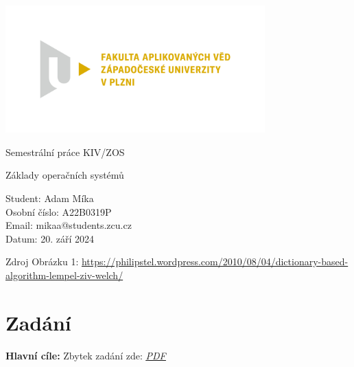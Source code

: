 \documentclass[12pt, a4paper]{article}
\begin{document}
\begin{titlepage}
    \includegraphics[width=0.75\textwidth]{img/fav.png}
    \begin{center}
        
        
        \vspace{2cm}
        
        \Huge
        Semestrální práce KIV/ZOS
        
        \vspace{1cm}
        
        \LARGE
        Základy operačních systémů
        
        \vfill
        
        \vspace{0.5cm}
        
        \normalsize
        \raggedright
        Student:        Adam Míka \\
        Osobní číslo:   A22B0319P \\
        Email:          mikaa@students.zcu.cz \\
        Datum:          20. září 2024
        \vspace{0.2cm}
        
    \end{center}
\end{titlepage}

\renewcommand{\cftsecleader}{\cftdotfill{\cftdotsep}}
\renewcommand{\cftsubsecleader}{\cftdotfill{\cftdotsep}}
\renewcommand{\cftsubsubsecleader}{\cftdotfill{\cftdotsep}}

\setcounter{page}{2}
\tableofcontents
\listoffigures
\lstlistoflistings
\begin{thebibliography}{99}
     Zdroj Obrázku 1: \url{https://philipstel.wordpress.com/2010/08/04/dictionary-based-algorithm-lempel-ziv-welch/}
  \end{thebibliography}
\pagebreak


\section{Zadání}
\large
\textbf{Hlavní cíle:}
\normalsize
Zbytek zadání zde: \href{https://portal.zcu.cz/CoursewarePortlets2/DownloadDokumentu?id=238432}{\textcolor[RGB]{20,20,200}{\underline{\textit{PDF}}}}
\end{document}
